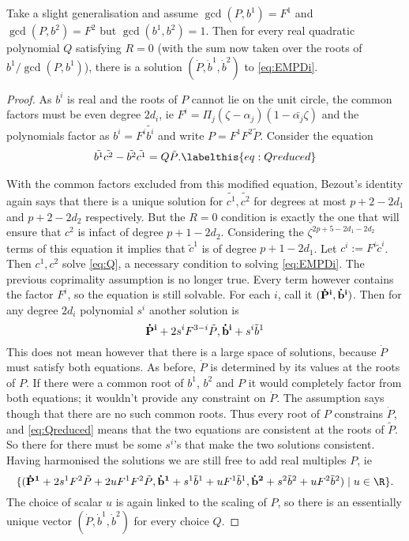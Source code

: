 \begin{lem}
Take a slight generalisation and assume $\gcd(P,b^1)=F^1$ and $\gcd(P,b^2)=F^2$ but $\gcd(b^1,b^2)=1$. Then for every real quadratic polynomial $Q$ satisfying $R=0$ (with the sum now taken over the roots of $b^1/\gcd(P,b^1)$), there is a solution $(\dot P, \dot b^1, \dot b^2)$ to \eqref{eq:EMPDi}.
\begin{proof}

As $b^i$ is real and the roots of $P$ cannot lie on the unit circle, the common factors must be even degree $2d_i$, ie $F^i=\Pi_j (ζ-α_j)(1-\bar{α_j}ζ)$ and the polynomials factor as $b^i = F^i\tilde{b^i}$ and write $P = F^1F^2\tilde{P}$. Consider the equation
\begin{align}
\tilde{b^1}\tilde{c^2} - \tilde{b^2}\tilde{c^1} = Q\tilde{P}.\labelthis{eq:Qreduced}
\end{align}

With the common factors excluded from this modified equation, Bezout's identity again says that there is a unique solution for $\tilde{c^1},\tilde{c^2}$ for degrees at most $p+2-2d_1$ and $p+2-2d_2$ respectively. But the $R=0$ condition is exactly the one that will ensure that $c^2$ is infact of degree $p+1-2d_2$. Considering the $ζ^{2p+5-2d_1-2d_2}$ terms of this equation it implies that $\tilde{c}^1$ is of degree $p+1-2d_1$. Let $c^i :=  F^i\tilde{c}^i$. Then $c^1, c^2$ solve \eqref{eq:Q}, a necessary condition to solving \eqref{eq:EMPDi}. The previous coprimality assumption is no longer true. Every term however contains the factor $F^i$, so the equation is still solvable. For each $i$, call it $({\bf\dot P^i}, {\bf\dot b^i})$. Then for any degree $2d_i$ polynomial $s^i$ another solution is
\[
{\bf\dot P^i} + 2s^i F^{3-i}\tilde P, {\bf\dot b^i} + s^i \tilde b^1
\]
This does not mean however that there is a large space of solutions, because $\dot P$ must satisfy both equations. As before, $\dot P$ is determined by its values at the roots of $P$. If there were a common root of $b^1$, $b^2$ and $P$ it would completely factor from both equations; it wouldn't provide any constraint on $\dot P$. The assumption says though that there are no such common roots. Thus every root of $P$ constrains $\dot P$, and \eqref{eq:Qreduced} means that the two equations are consistent at the roots of $\tilde P$. So there for there must be some $s^i$'s that make the two solutions consistent. Having harmonised the solutions we are still free to add real multiples $P$, ie
\[
\{ ({\bf \dot P^1} + 2s^1 F^2 \tilde{P} + 2u F^1F^2\tilde{P}, {\bf \dot b^1} + s^1\tilde{b}^1 + u F^1\tilde{b}^1, {\bf \dot b^2} + s^2\tilde{b}^2 + uF^2 \tilde{b}^2) \mid u \in \R\}.
\]
The choice of scalar $u$ is again linked to the scaling of $P$, so there is an essentially unique vector $(\dot P, \dot b^1, \dot b^2)$ for every choice $Q$.
\end{proof}
\end{lem}












